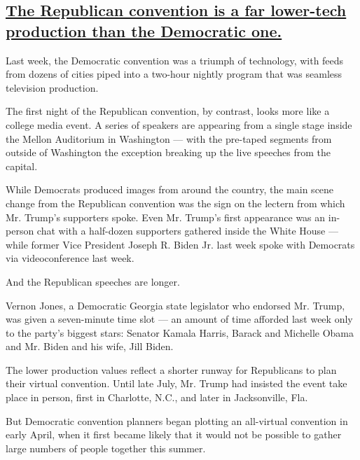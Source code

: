 \hypertarget{the-republican-convention-is-a-far-lower-tech-production-than-the-democratic-one}{%
\subsection{\texorpdfstring{\protect\hyperlink{the-republican-convention-is-a-far-lower-tech-production-than-the-democratic-one}{The
Republican convention is a far lower-tech production than the Democratic
one.}}{The Republican convention is a far lower-tech production than the Democratic one.}}\label{the-republican-convention-is-a-far-lower-tech-production-than-the-democratic-one}}

Last week, the Democratic convention was a triumph of technology, with
feeds from dozens of cities piped into a two-hour nightly program that
was seamless television production.

The first night of the Republican convention, by contrast, looks more
like a college media event. A series of speakers are appearing from a
single stage inside the Mellon Auditorium in Washington --- with the
pre-taped segments from outside of Washington the exception breaking up
the live speeches from the capital.

While Democrats produced images from around the country, the main scene
change from the Republican convention was the sign on the lectern from
which Mr. Trump's supporters spoke. Even Mr. Trump's first appearance
was an in-person chat with a half-dozen supporters gathered inside the
White House --- while former Vice President Joseph R. Biden Jr. last
week spoke with Democrats via videoconference last week.

And the Republican speeches are longer.

Vernon Jones, a Democratic Georgia state legislator who endorsed Mr.
Trump, was given a seven-minute time slot --- an amount of time afforded
last week only to the party's biggest stars: Senator Kamala Harris,
Barack and Michelle Obama and Mr. Biden and his wife, Jill Biden.

The lower production values reflect a shorter runway for Republicans to
plan their virtual convention. Until late July, Mr. Trump had insisted
the event take place in person, first in Charlotte, N.C., and later in
Jacksonville, Fla.

But Democratic convention planners began plotting an all-virtual
convention in early April, when it first became likely that it would not
be possible to gather large numbers of people together this summer.

